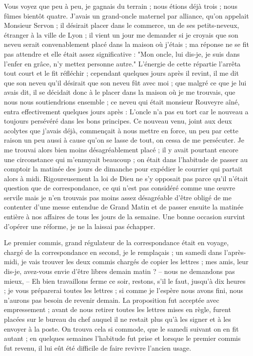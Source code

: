 \documentclass[11pt,a4paper]{report}
\begin{document}
Vous voyez que peu à peu, je gagnais du terrain ; nous étions déjà trois ; nous fûmes bientôt quatre. J'avais un grand-oncle maternel par alliance, qu'on appelait Monsieur Servon ; il désirait placer dans le commerce, un de ses petits-neveux, étranger à la ville de Lyon ; il vient un jour me demander si je croyais que son neveu serait convenablement placé dans la maison où j'étais ; ma réponse ne se fit pas attendre et elle était assez significative : "Mon oncle, lui dis-je, je suis dans l'enfer en grâce, n'y mettez personne autre." L'énergie de cette répartie l'arrêta tout court et le fit réfléchir ; cependant quelques jours après il revint, il me dit que son neveu qu'il désirait que son neveu fût avec moi ; que malgré ce que je lui avais dit, il se décidait donc à le placer dans la maison où je me trouvais, que nous nous soutiendrions ensemble ; ce neveu qui était monsieur Rouveyre aîné, entra effectivement quelques jours après : L'oncle n'a pas eu tort car le nouveau a toujours persévéré dans les bons principes. Ce nouveau venu, joint aux deux acolytes que j'avais déjà, commençait à nous mettre en force, un peu par cette raison un peu aussi à cause qu'on se lasse de tout, on cessa de me persécuter. Je me trouvai alors bien moins désagréablement placé ; il y avait pourtant encore une circonstance qui m'ennuyait beaucoup ; on était dans l'habitude de passer au comptoir la matinée des jours de dimanche pour expédier le courrier qui partait alors à midi. Rigoureusement la loi de Dieu ne s'y opposait pas parce qu'il n'était question que de correspondance, ce qui n'est pas considéré comme une œuvre servile mais je n'en trouvais pas moins assez désagréable d'être obligé de me contenter d'une messe entendue de Grand Matin et de passer ensuite la matinée entière à nos affaires de tous les jours de la semaine. Une bonne occasion survint d'opérer une réforme, je ne la laissai pas échapper.

Le premier commis, grand régulateur de la correspondance était en voyage, chargé de la correspondance en second, je le remplaçais ; un samedi dans l'après-midi, je vais trouver les deux commis chargés de copier les lettres ; mes amis, leur dis-je, avez-vous envie d'être libres demain matin ? -- nous ne demandons pas mieux, -- Eh bien travaillons ferme ce soir, restons, s'il le faut, jusqu'à dix heures ; je vous préparerai toutes les lettres ; si comme je l'espère nous avons fini, nous n'aurons pas besoin de revenir demain. La proposition fut acceptée avec empressement ; avant de nous retirer toutes les lettres mises en règle, furent placées sur le bureau du chef auquel il ne restait plus qu'à les signer et à les envoyer à la poste. On trouva cela si commode, que le samedi suivant on en fit autant ; en quelques semaines l'habitude fut prise et lorsque le premier commis fut revenu, il lui eût été difficile de faire revivre l'ancien usage.
\end{document}
